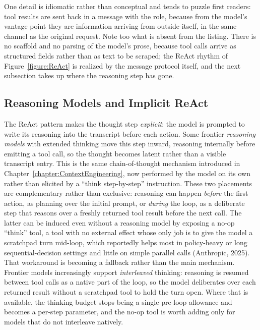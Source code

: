 One detail is idiomatic rather than conceptual and tends to puzzle first readers: tool results are sent back in a message with the  role, because from the model's vantage point they are information arriving from outside itself, in the same channel as the original request.
Note too what is absent from the listing.
There is no  scaffold and no parsing of the model's prose, because tool calls arrive as structured fields rather than as text to be scraped; the ReAct rhythm of Figure~\ref{figure:ReAct} is realized by the message protocol itself, and the next subsection takes up where the reasoning step has gone.

\subsection{Reasoning Models and Implicit ReAct}

The ReAct pattern makes the thought step \emph{explicit}: the model is prompted to write its reasoning into the transcript before each action.
Some frontier \emph{reasoning models} with extended thinking move this step inward, reasoning internally before emitting a tool call, so the thought becomes latent rather than a visible transcript entry.
This is the same chain-of-thought mechanism introduced in Chapter~\ref{chapter:ContextEngineering}, now performed by the model on its own rather than elicited by a ``think step-by-step'' instruction.
These two placements are complementary rather than exclusive: reasoning can happen \emph{before} the first action, as planning over the initial prompt, or \emph{during} the loop, as a deliberate step that reasons over a freshly returned tool result before the next call.
The latter can be induced even without a reasoning model by exposing a no-op ``think'' tool, a tool with no external effect whose only job is to give the model a scratchpad turn mid-loop, which reportedly helps most in policy-heavy or long sequential-decision settings and little on simple parallel calls (Anthropic, 2025).
That workaround is becoming a fallback rather than the main mechanism.
Frontier models increasingly support \emph{interleaved} thinking: reasoning is resumed between tool calls as a native part of the loop, so the model deliberates over each returned result without a scratchpad tool to hold the turn open.
Where that is available, the thinking budget stops being a single pre-loop allowance and becomes a per-step parameter, and the no-op tool is worth adding only for models that do not interleave natively.


